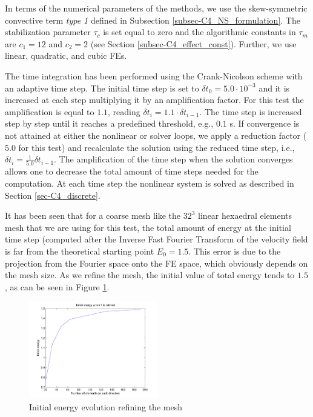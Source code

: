 In terms of the numerical parameters of the methods, we use the skew-symmetric convective term \textit{type 1} defined in Subsection \ref{subsec-C4_NS_formulation}. 
The stabilization parameter $\tau_c$ is set equal to zero and the algorithmic constants in $\tau_m$ are $c_1=12$ and $c_2=2$ (see Section \ref{subsec-C4_effect_const}).
Further, we use linear, quadratic, and cubic FEs.

The time integration has been performed using the Crank-Nicolson scheme with an adaptive time step. The initial time step is set to $\delta t_0=5.0\cdot10^{-3}$ and it is increased at each step multiplying it by an amplification factor. For this test the amplification is equal to $1.1$, reading $\delta t_i=1.1\cdot\delta t_{i-1}$. The time step is increased step by step until it reaches a predefined threshold, e.g., $0.1$ s. If convergence is not attained at either the nonlinear or solver loops,  we apply a reduction factor ($5.0$ for this test) and recalculate the solution using the reduced time step, i.e., $\delta t_i=\frac{1}{5.0}\delta t_{i-1}$. The amplification of the time step when the solution converges %
allows one to decrease the total amount of time steps needed for the computation. %
At each time step the nonlinear system is solved as described in Section \ref{sec-C4_discrete}. 

It has been seen that for a coarse mesh like the $32^3$ linear hexaedral elements mesh that we are using for this test, the total amount of energy at the initial time step (computed after the Inverse Fast Fourier Transform of the velocity field is far from the theoretical starting point $E_0=1.5$. This error is due to the projection from the Fourier space onto the FE space, which obviously depends on the mesh size. As we refine the mesh, the initial value of total energy tends to $1.5$, as can be seen in Figure \ref{fig:initial_ene}.
\begin{figure}[h!]
	\centering	
	\includegraphics[width=0.5\textwidth]{Figures/Chapter4/DHIT/Initial_ene}
	\caption{Initial energy evolution refining the mesh}
	\label{fig:initial_ene}
\end{figure}

